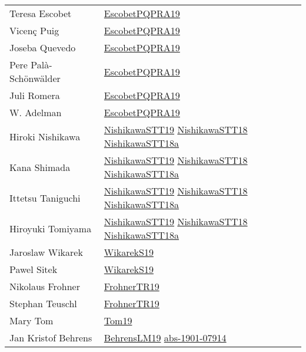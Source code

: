 {\begin{longtable}{p{4cm}p{15cm}}
Teresa Escobet & \href{articles/EscobetPQPRA19.pdf}{EscobetPQPRA19}\cite{EscobetPQPRA19} \\
Vicen{\c{c}} Puig & \href{articles/EscobetPQPRA19.pdf}{EscobetPQPRA19}\cite{EscobetPQPRA19} \\
Joseba Quevedo & \href{articles/EscobetPQPRA19.pdf}{EscobetPQPRA19}\cite{EscobetPQPRA19} \\
Pere Pal{\`{a}}{-}Sch{\"{o}}nw{\"{a}}lder & \href{articles/EscobetPQPRA19.pdf}{EscobetPQPRA19}\cite{EscobetPQPRA19} \\
Juli Romera & \href{articles/EscobetPQPRA19.pdf}{EscobetPQPRA19}\cite{EscobetPQPRA19} \\
W. Adelman & \href{articles/EscobetPQPRA19.pdf}{EscobetPQPRA19}\cite{EscobetPQPRA19} \\
Hiroki Nishikawa & \href{articles/NishikawaSTT19.pdf}{NishikawaSTT19}\cite{NishikawaSTT19} \href{papers/NishikawaSTT18.pdf}{NishikawaSTT18}\cite{NishikawaSTT18} \href{papers/NishikawaSTT18a.pdf}{NishikawaSTT18a}\cite{NishikawaSTT18a} \\
Kana Shimada & \href{articles/NishikawaSTT19.pdf}{NishikawaSTT19}\cite{NishikawaSTT19} \href{papers/NishikawaSTT18.pdf}{NishikawaSTT18}\cite{NishikawaSTT18} \href{papers/NishikawaSTT18a.pdf}{NishikawaSTT18a}\cite{NishikawaSTT18a} \\
Ittetsu Taniguchi & \href{articles/NishikawaSTT19.pdf}{NishikawaSTT19}\cite{NishikawaSTT19} \href{papers/NishikawaSTT18.pdf}{NishikawaSTT18}\cite{NishikawaSTT18} \href{papers/NishikawaSTT18a.pdf}{NishikawaSTT18a}\cite{NishikawaSTT18a} \\
Hiroyuki Tomiyama & \href{articles/NishikawaSTT19.pdf}{NishikawaSTT19}\cite{NishikawaSTT19} \href{papers/NishikawaSTT18.pdf}{NishikawaSTT18}\cite{NishikawaSTT18} \href{papers/NishikawaSTT18a.pdf}{NishikawaSTT18a}\cite{NishikawaSTT18a} \\
Jaroslaw Wikarek & \href{articles/WikarekS19.pdf}{WikarekS19}\cite{WikarekS19} \\
Pawel Sitek & \href{articles/WikarekS19.pdf}{WikarekS19}\cite{WikarekS19} \\
Nikolaus Frohner & \href{papers/FrohnerTR19.pdf}{FrohnerTR19}\cite{FrohnerTR19} \\
Stephan Teuschl & \href{papers/FrohnerTR19.pdf}{FrohnerTR19}\cite{FrohnerTR19} \\
Mary Tom & \href{papers/Tom19.pdf}{Tom19}\cite{Tom19} \\
Jan Kristof Behrens & \href{papers/BehrensLM19.pdf}{BehrensLM19}\cite{BehrensLM19} \href{articles/abs-1901-07914.pdf}{abs-1901-07914}\cite{abs-1901-07914} \\

\end{longtable}}
